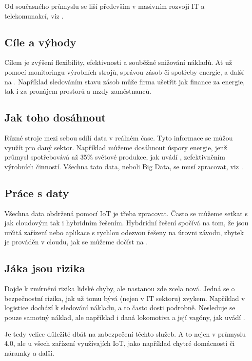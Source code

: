 \documentclass[a4paper, 11pt]{article}
\begin{document}
Od současného průmyslu se liší především v masivním rozvoji IT a telekomunakcí, viz \cite{Helios2017}.

\subsection{Cíle a výhody}
Cílem je zvýšení flexibility, efektivnosti a souběžné snižování nákladů. Ať už pomocí monitoringu výrobních strojů, správou zásob či spotřeby energie, a další na \cite{Serpanos2018}. Například sledováním stavu zásob může firma ušetřit jak finance za energie, tak i za pronájem prostorů a mzdy zaměstnanců. 

\subsection{Jak toho dosáhnout}
Různé stroje mezi sebou sdílí data v reálném čase. Tyto informace se můžou využít pro daný sektor. Například můžeme dosáhnout úspory energie, jenž průmysl spotřebovává až 35\% světové produkce, jak uvádí \cite{Silva2020}, zefektivněním výrobních činností. Všechna tato data, neboli Big Data, se musí zpracovat, viz \cite{Nagpal2020}.

\subsection{Práce s daty}
Všechna data obdržená pomocí IoT je třeba zpracovat. Často se můžeme setkat s jak cloudovým tak i hybridním řešením. Hybdridní řešení spočívá na tom, že jsou určitá zařízení nebo aplikace s rychlou odezvou řešeny na úrovni závodu, zbytek je prováděn v cloudu, jak se můžeme dočíst na \cite{Varva2020}.

\subsection{Jáka jsou rizika}
Dojde k zmírnění rizika lidské chyby, ale nastanou zde zcela nová. Jedná se o bezpečnostní rizika, jak už tomu bývá (nejen v IT sektoru) zvykem.
Například v logistice dochází k sledování nákladu, a to často dosti podrobně. Nesleduje se pouze samotný náklad, ale například i daná lokomotiva a její vagóny, jak uvádí \cite{Kodym2016}.

Je tedy velice důležité dbát na zabezpečení těchto služeb. A to nejen v průmyslu 4.0, ale u všech zařízení využívajích IoT, jako například chytré domácnosti či náramky a další.

\newpage


\end{document}
